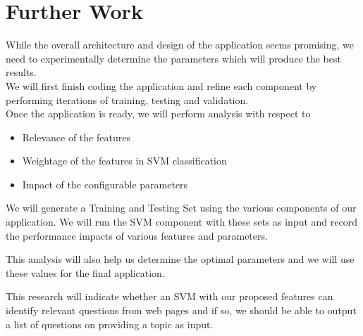 \documentclass[10pt,a4paper]{report}
\begin{document}

\chapter{Further Work}

While the overall architecture and design of the application seems promising, we need to experimentally determine the parameters which will produce the best results. \\

We will first finish coding the application and refine each component by performing iterations of training, testing and validation. \\

Once the application is ready, we will perform analysis with respect to 

\begin{itemize}
	\item Relevance of the features
	\item Weightage of the features in SVM classification
	\item Impact of the configurable parameters
\end{itemize}

We will generate a Training and Testing Set using the various components of our application. 
We will run the SVM component with these sets as input and record the performance impacts of various features and parameters.

This analysis will also help us determine the optimal parameters and we will use these values for the final application. 

This research will indicate whether an SVM with our proposed features can identify relevant questions from web pages and if so, we should be able to output a list of questions on providing a topic as input.

\end{document}
